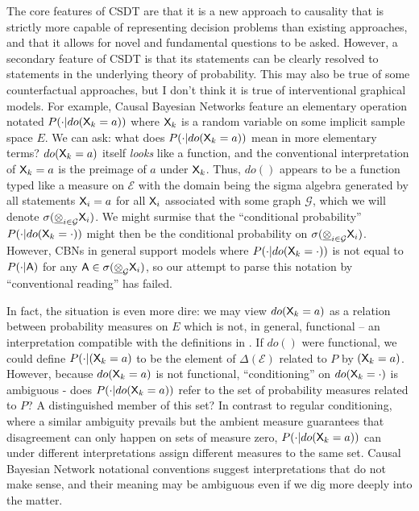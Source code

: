 The core features of CSDT are that it is a new approach to causality that is strictly more capable of representing decision problems than existing approaches, and that it allows for novel and fundamental questions to be asked. However, a secondary feature of CSDT is that its statements can be clearly resolved to statements in the underlying theory of probability. This may also be true of some counterfactual approaches, but I don't think it is true of interventional graphical models. For example, Causal Bayesian Networks feature an elementary operation notated $P(\cdot|do(\mathsf{X}_k=a))$ where $\mathsf{X}_k$ is a random variable on some implicit sample space $E$. We can ask: what does $P(\cdot|do(\mathsf{X}_k=a))$ mean in more elementary terms? $do(\mathsf{X}_k=a)$ itself \emph{looks} like a function, and the conventional interpretation of $\mathsf{X}_k=a$ is the preimage of $a$ under $\mathsf{X}_k$. Thus, $do()$ appears to be a function typed like a measure on $\mathcal{E}$ with the domain being the sigma algebra generated by all statements $\mathsf{X}_i=a$ for all $\mathsf{X}_i$ associated with some graph $\mathcal{G}$, which we will denote $\sigma(\underline{\otimes}_{i\in \mathcal{G}} \mathsf{X}_i)$. We might surmise that the ``conditional probability'' $P(\cdot|do(\mathsf{X}_k=\cdot))$ might then be the conditional probability on $\sigma(\underline{\otimes}_{i\in \mathcal{G}} \mathsf{X}_i)$. However, CBNs in general support models where $P(\cdot|do(\mathsf{X}_k=\cdot))$ is not equal to $P(\cdot|\mathsf{A})$ for any $\mathsf{A}\in \sigma(\underline{\otimes}_\mathcal{G} \mathsf{X}_i)$, so our attempt to parse this notation by ``conventional reading'' has failed.

In fact, the situation is even more dire: we may view $do(\mathsf{X}_k=a)$ as a relation between probability measures on $E$ which is not, in general, functional -- an interpretation compatible with the definitions in \citet{pearl_causality:_2009}. If $do()$ were functional, we could define $P(\cdot|\do(\RV{X}_k=a)$ to be the element of $\Delta(\mathcal{E})$ related to $P$ by $\do(\RV{X}_k=a)$. However, because $do(\mathsf{X}_k=a)$ is not functional, ``conditioning'' on $do(\mathsf{X}_k=\cdot)$ is ambiguous - does $P(\cdot|do(\mathsf{X}_k=a))$ refer to the set of probability measures related to $P$? A distinguished member of this set? In contrast to regular conditioning, where a similar ambiguity prevails but the ambient measure guarantees that disagreement can only happen on sets of measure zero, $P(\cdot|do(\mathsf{X}_k=a))$ can under different interpretations assign different measures to the same set. Causal Bayesian Network notational conventions suggest interpretations that do not make sense, and their meaning may be ambiguous even if we dig more deeply into the matter.

